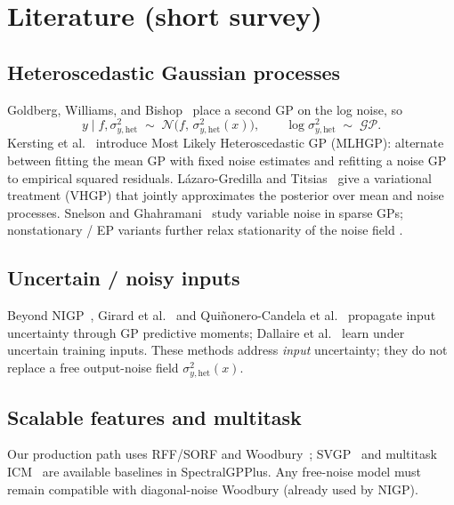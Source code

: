 \documentclass[11pt]{article}
\newcommand{\sighet}{\sigma_{y,\mathrm{het}}^{2}}%
\begin{document}
\section{Literature (short survey)}

\subsection{Heteroscedastic Gaussian processes}
Goldberg, Williams, and Bishop~\cite{goldberg1998heteroscedastic} place a second GP on
the log noise, so
\begin{equation}
\label{eq:goldberg}
  y\mid f,\sighet \;\sim\; \mathcal N\bigl(f,\,\sighet(x)\bigr),\qquad
  \log\sighet \;\sim\; \mathcal{GP}.
\end{equation}
Kersting et al.~\cite{kersting2007mlhgp} introduce Most Likely Heteroscedastic GP (MLHGP):
alternate between fitting the mean GP with fixed noise estimates and refitting a noise GP
to empirical squared residuals.
L\'azaro-Gredilla and Titsias~\cite{lazaro2011vhgp} give a variational treatment (VHGP)
that jointly approximates the posterior over mean and noise processes.
Snelson and Ghahramani~\cite{snelson2006variable} study variable noise in sparse GPs;
nonstationary / EP variants further relax stationarity of the noise field
\cite{tolvanen2014nonstationary,heinonen2016nonstationary}.

\subsection{Uncertain / noisy inputs}
Beyond NIGP~\cite{mchutchon2011nigp}, Girard et al.~\cite{girard2003uncertain} and
Qui\~nonero-Candela et al.~\cite{quinonero2003propagation} propagate input uncertainty
through GP predictive moments; Dallaire et al.~\cite{dallaire2009uncertain} learn under
uncertain training inputs.
These methods address \emph{input} uncertainty; they do not replace a free output-noise field
$\sighet(x)$.

\subsection{Scalable features and multitask}
Our production path uses RFF/SORF and Woodbury~\cite{rahimi2007rff,yu2016orf,cutajar2017dgp};
SVGP~\cite{hensman2013svgp} and multitask ICM~\cite{bonilla2008mtgp} are available baselines
in SpectralGPPlus.
Any free-noise model must remain compatible with diagonal-noise Woodbury (already used by NIGP).
\end{document}
